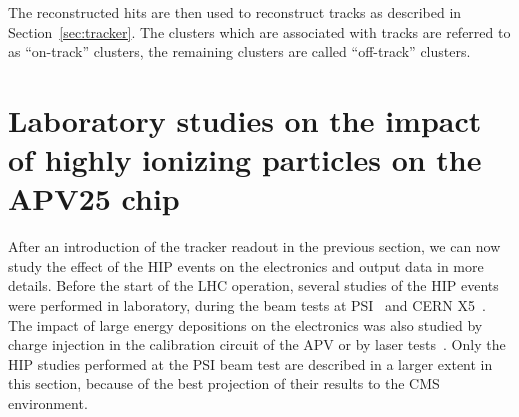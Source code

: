 
The reconstructed hits are then used to reconstruct tracks as described in Section~\ref{sec:tracker}. The clusters which are associated with tracks are referred to as ``on-track'' clusters, the remaining clusters are called ``off-track'' clusters.


\section{Laboratory studies on the impact of highly ionizing particles on the APV25 chip~\label{sec:HIPinPast}}


After an introduction of the tracker readout in the previous section, we can now study the effect of the HIP events on the electronics and output data in more details. Before the start of the LHC operation, several studies of the HIP events were performed in laboratory, during the beam tests at PSI~\cite{Tomalin:2003aaa} and CERN X5~\cite{Bainbridge:2002bda}. The impact of large energy depositions on the electronics was also studied by charge injection in the calibration circuit of the APV or by laser tests~\cite{Adam:2005pz}. Only the HIP studies performed at the PSI beam test are described in a larger extent in this section, because of the best projection of their results to the CMS environment.

